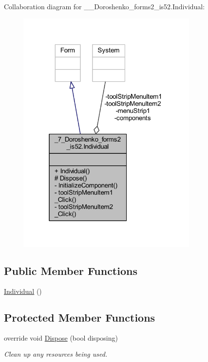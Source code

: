 Collaboration diagram for \+\_\+\_\+\+Doroshenko\+\_\+forms2\+\_\+is52.\+Individual\+:
\nopagebreak
\begin{figure}[H]
\begin{center}
\leavevmode
\includegraphics[width=255pt]{class__7___doroshenko__forms2__is52_1_1_individual__coll__graph}
\end{center}
\end{figure}
\subsection*{Public Member Functions}
\begin{DoxyCompactItemize}
\item 
\hyperlink{class__7___doroshenko__forms2__is52_1_1_individual_a3911f629d8bd477180a7dfc86203fe37}{Individual} ()
\end{DoxyCompactItemize}
\subsection*{Protected Member Functions}
\begin{DoxyCompactItemize}
\item 
override void \hyperlink{class__7___doroshenko__forms2__is52_1_1_individual_a1bd1c8c3cb0bee2054c7fd5c51402015}{Dispose} (bool disposing)
\begin{DoxyCompactList}\small\item\em Clean up any resources being used. \end{DoxyCompactList}\end{DoxyCompactItemize}
